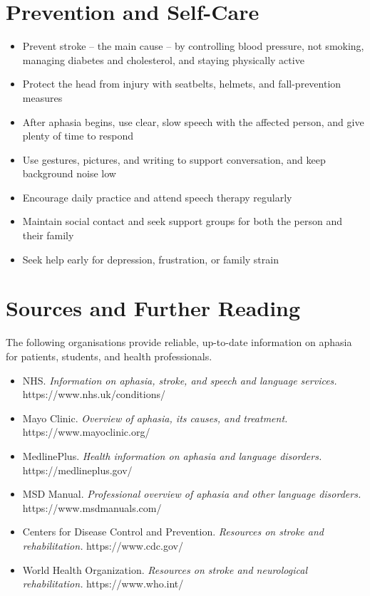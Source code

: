 \section*{Prevention and Self-Care}
\begin{itemize}
    \item Prevent stroke -- the main cause -- by controlling blood pressure, not smoking, managing diabetes and cholesterol, and staying physically active
    \item Protect the head from injury with seatbelts, helmets, and fall-prevention measures
    \item After aphasia begins, use clear, slow speech with the affected person, and give plenty of time to respond
    \item Use gestures, pictures, and writing to support conversation, and keep background noise low
    \item Encourage daily practice and attend speech therapy regularly
    \item Maintain social contact and seek support groups for both the person and their family
    \item Seek help early for depression, frustration, or family strain
\end{itemize}

\section*{Sources and Further Reading}
The following organisations provide reliable, up-to-date information on aphasia for patients, students, and health professionals.

\begin{itemize}
    \item NHS. \textit{Information on aphasia, stroke, and speech and language services.} https://www.nhs.uk/conditions/
    \item Mayo Clinic. \textit{Overview of aphasia, its causes, and treatment.} https://www.mayoclinic.org/
    \item MedlinePlus. \textit{Health information on aphasia and language disorders.} https://medlineplus.gov/
    \item MSD Manual. \textit{Professional overview of aphasia and other language disorders.} https://www.msdmanuals.com/
    \item Centers for Disease Control and Prevention. \textit{Resources on stroke and rehabilitation.} https://www.cdc.gov/
    \item World Health Organization. \textit{Resources on stroke and neurological rehabilitation.} https://www.who.int/
\end{itemize}
